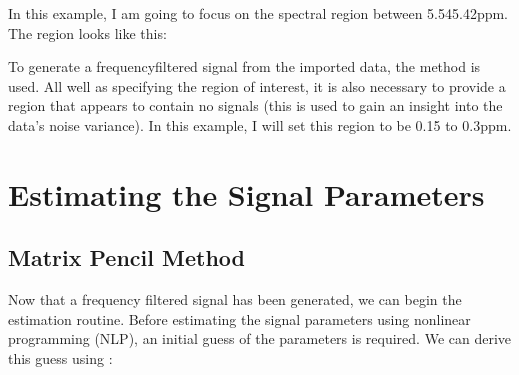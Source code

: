 \documentclass[letterpaper,10pt,english]{sphinxmanual}
\begin{document}
\sphinxAtStartPar
In this example, I am going to focus on the spectral region between
5.54\sphinxhyphen{}5.42ppm. The region looks like this:


\sphinxAtStartPar
To generate a frequency\sphinxhyphen{}filtered signal from the imported data, the
{\hyperref[\detokenize{references/core:nmrespy.core.Estimator.frequency_filter}]{}} method is used. All well as
specifying the region of interest, it is also necessary to provide a region
that appears to contain no signals (this is used to gain an insight into the
data’s noise variance). In this example, I will set this region to be \sphinxhyphen{}0.15 to
\sphinxhyphen{}0.3ppm.

\begin{sphinxVerbatim}[commandchars=\\\{\}]
\PYG{p}{[}\PYG{p}{[} \PYG{p}{]}\PYG{p}{]} \PYG{p}{[}\PYG{p}{[} \PYG{p}{]}\PYG{p}{]}
\end{sphinxVerbatim}


\section{Estimating the Signal Parameters}
\label{\detokenize{walkthrough:estimating-the-signal-parameters}}

\subsection{Matrix Pencil Method}
\label{\detokenize{walkthrough:matrix-pencil-method}}
\sphinxAtStartPar
Now that a frequency filtered signal has been generated, we can begin the
estimation routine. Before estimating the signal parameters using nonlinear
programming (NLP), an initial guess of the parameters is required. We can derive
this guess using {\hyperref[\detokenize{references/core:nmrespy.core.Estimator.matrix_pencil}]{}}:
\end{document}
